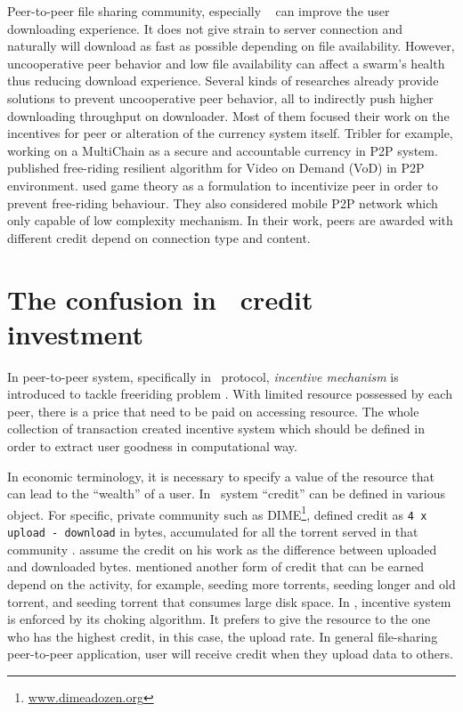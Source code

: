 Peer-to-peer file sharing community, especially \bt~ can improve the user downloading experience. It does not give strain to server connection and naturally will download as fast as possible depending on file availability. However, uncooperative peer behavior and low file availability can affect a swarm's health thus reducing download experience. Several kinds of researches already provide solutions to prevent uncooperative peer behavior, all to indirectly push higher downloading throughput on downloader. Most of them focused their work on the incentives for peer or alteration of the currency system itself. Tribler for example, working on a MultiChain \cite{2015:multichain:norberhuis} as a secure and accountable currency in P2P system. \citeauthor{2008:givetogetvod:Mol} published free-riding resilient algorithm for Video on Demand (VoD) in P2P environment\cite{2008:givetogetvod:Mol}. \citeauthor{2015:incentivep2pgame:kang} used game theory as a formulation to incentivize peer in order to prevent free-riding behaviour\cite{2015:incentivep2pgame:kang}. They also considered mobile P2P network which only capable of low complexity mechanism. In their work, peers are awarded with different credit depend on connection type and content.

\section{The confusion in \bt~credit investment}
In peer-to-peer system, specifically in \bt~protocol, \textit{incentive mechanism} is introduced to tackle freeriding problem \cite{2003:bittorrent:cohen}. With limited resource possessed by each peer, there is a price that need to be paid on accessing resource. The whole collection of transaction created incentive system which should be defined in order to extract user goodness in computational way.

In economic terminology, it is necessary to specify a value of the resource that can lead to the ``wealth'' of a user. In \bt~system ``credit'' can be defined in various object. For specific, private community such as DIME\footnote{\url{www.dimeadozen.org}}, \citeauthor{2012:economicbt:kash}  defined credit as \texttt{4 x upload - download} in bytes, accumulated for all the torrent served in that community \cite{2012:economicbt:kash}. \citeauthor{2015:creditmining:capota} assume the credit on his work as the difference between uploaded and downloaded bytes. \citeauthor{2014:sustainabilitytorrent:chen} mentioned another form of credit that can be earned depend on the activity, for example, seeding more torrents, seeding longer and old torrent, and seeding torrent that consumes large disk space\cite{2014:sustainabilitytorrent:chen}. In \bt, incentive system is enforced by its choking algorithm. It prefers to give the resource to the one who has the highest credit, in this case, the upload rate. In general file-sharing peer-to-peer application, user will receive credit when they upload data to others.

